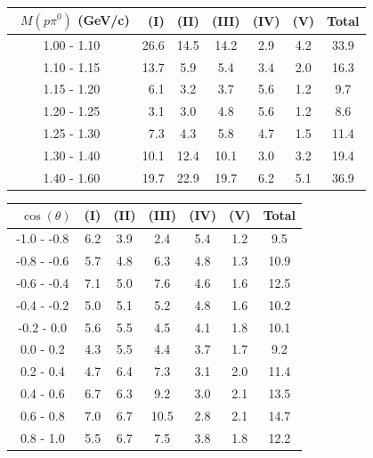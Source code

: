 \documentclass[aps, prd, reprint,showpacs,  preprintnumbers,amsmath,amssymb,superscriptaddress, nofootinbib]{revtex4-1}
\makeatletter
\renewenvironment{table}
  {\def\@captype{table}}
  {}
\makeatother
\begin{document}
\vspace{0.5cm}

\begin{table}
\begin{tabular}{crccccc}
\hline
~$M(p\pi^{0})$ (GeV/c) & (I) & (II) & (III) & (IV) & (V) & Total \\
\hline
   1.00 - 1.10 & 26.6 & 14.5 & 14.2 &  2.9 &  4.2 & 33.9 \\
   1.10 - 1.15 & 13.7 &  5.9 &  5.4 &  3.4 &  2.0 & 16.3 \\
   1.15 - 1.20 &  6.1 &  3.2 &  3.7 &  5.6 &  1.2 &  9.7 \\
   1.20 - 1.25 &  3.1 &  3.0 &  4.8 &  5.6 &  1.2 &  8.6 \\
   1.25 - 1.30 &  7.3 &  4.3 &  5.8 &  4.7 &  1.5 & 11.4 \\
   1.30 - 1.40 & 10.1 & 12.4 & 10.1 &  3.0 &  3.2 & 19.4 \\
   1.40 - 1.60 & 19.7 & 22.9 & 19.7 &  6.2 &  5.1 & 36.9 \\
\hline
\hline
\end{tabular}
\caption{Fractional systematic uncertainties (in percent) for $d\sigma/dM(p\pi^{0})$.\\
NOTE: Result is for the $\Delta$-enriched subsample with $T_{p}>100$\,MeV and $W<1.4$\,GeV.}
\label{tb:syst-MppizW14}
\end{table}

\vspace{0.5cm}


\begin{table}
\begin{tabular}{crccccc}
\hline
~$\cos(\theta)$ & (I) & (II) & (III) & (IV) & (V) & Total \\
\hline
   -1.0 - -0.8 &  6.2 &  3.9 &  2.4 &  5.4 &  1.2 &  9.5 \\
   -0.8 - -0.6 &  5.7 &  4.8 &  6.3 &  4.8 &  1.3 & 10.9 \\
   -0.6 - -0.4 &  7.1 &  5.0 &  7.6 &  4.6 &  1.6 & 12.5 \\
   -0.4 - -0.2 &  5.0 &  5.1 &  5.2 &  4.8 &  1.6 & 10.2 \\
    -0.2 - 0.0 &  5.6 &  5.5 &  4.5 &  4.1 &  1.8 & 10.1 \\
     0.0 - 0.2 &  4.3 &  5.5 &  4.4 &  3.7 &  1.7 &  9.2 \\
     0.2 - 0.4 &  4.7 &  6.4 &  7.3 &  3.1 &  2.0 & 11.4 \\
     0.4 - 0.6 &  6.7 &  6.3 &  9.2 &  3.0 &  2.1 & 13.5 \\
     0.6 - 0.8 &  7.0 &  6.7 & 10.5 &  2.8 &  2.1 & 14.7 \\
     0.8 - 1.0 &  5.5 &  6.7 &  7.5 &  3.8 &  1.8 & 12.2 \\
\hline
\hline
\end{tabular}
\caption{Fractional systematic uncertainties (in percent) for $d\sigma/d\cos(\theta)$.\\
NOTE: Result is for the $\Delta$-enriched subsample with $T_{p}>100$\,MeV and $W<1.4$\,GeV.}
\label{tb:syst-zenith}
\end{table}
\end{document}

